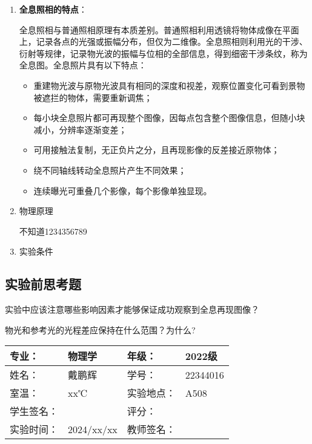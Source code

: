 \documentclass[dvipsnames, svgnames,a4paper,11pt]{article}
\begin{document}
	\begin{enumerate}
		\item \textbf{全息照相的特点}：
		
			全息照相与普通照相原理有本质差别。普通照相利用透镜将物体成像在平面上，记录各点的光强或振幅分布，但仅为二维像。全息照相则利用光的干涉、衍射等规律，记录物光波的振幅与位相的全部信息，得到细密干涉条纹，称为全息图。全息照片具有以下特点：
			\begin{itemize}
				\item 重建物光波与原物光波具有相同的深度和视差，观察位置变化可看到景物被遮拦的物体，需要重新调焦；
				
				\item 每小块全息照片都可再现整个图像，因每点包含整个图像信息，但随小块减小，分辨率逐渐变差；
				
				\item 可用接触法复制，无正负片之分，且再现影像的反差接近原物体；
				
				\item 绕不同轴线转动全息照片产生不同效果；
				
				\item 连续曝光可重叠几个影像，每个影像单独显现。
			\end{itemize}
		\item 物理原理
			
			不知道1234356789
			
			
			
			
			
			
		\item 实验条件
			
			

	\end{enumerate}

\subsection{实验前思考题}
	\begin{question}
		实验中应该注意哪些影响因素才能够保证成功观察到全息再现图像？
	\end{question}
		
		
		
		
		
		

	\begin{question}
		物光和参考光的光程差应保持在什么范围？为什么?
	\end{question}
		

\clearpage
\begin{table}
	\renewcommand\arraystretch{1.7}
	\centering
	\begin{tabularx}{\textwidth}{|X|X|X|X|}
	\hline
	专业：& 物理学 &年级：& 2022级 \\
	\hline
	姓名：& 戴鹏辉 & 学号：& 22344016 \\
	\hline
	室温：& xx℃ & 实验地点： & A508 \\
	\hline
	学生签名：& & 评分： &\\
	\hline
	实验时间：& 2024/xx/xx & 教师签名：&\\
	\hline
	\end{tabularx}
\end{table}
\end{document}
